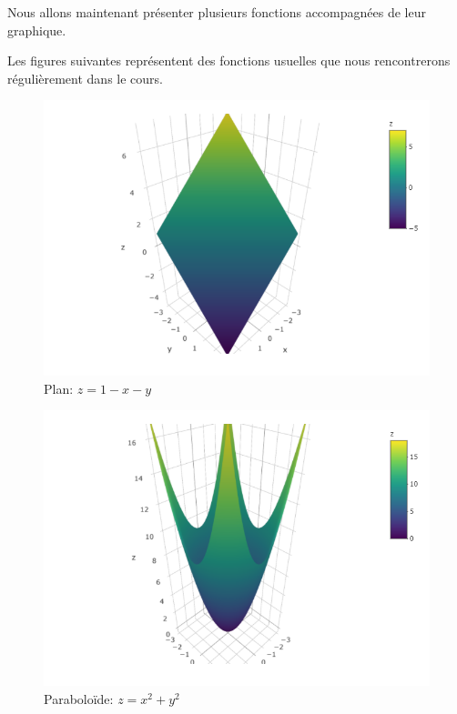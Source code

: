 \documentclass[]{book}
\theoremstyle{definition}
\theoremstyle{definition}
\theoremstyle{definition}
\theoremstyle{remark}
\begin{document}
Nous allons maintenant présenter plusieurs fonctions accompagnées de
leur graphique.

Les figures suivantes représentent des fonctions usuelles que nous
rencontrerons régulièrement dans le cours.

\begin{figure}

{\centering \includegraphics[width=0.8\linewidth]{resources/images/plan} 

}

\caption{Plan: $z=1-x-y$}\label{fig:plan}
\end{figure}

\begin{figure}

{\centering \includegraphics[width=0.8\linewidth]{resources/images/paraboloide} 

}

\caption{Paraboloïde: $z=x^2+y^2$}\label{fig:paraboloide}
\end{figure}
\end{document}
